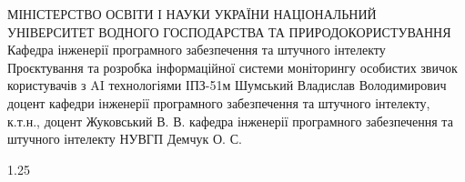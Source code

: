 \documentclass[14pt,a4paper]{extarticle}
\begin{document}
    \makepracticetitlepage
    {МІНІСТЕРСТВО ОСВІТИ І НАУКИ УКРАЇНИ}
    {НАЦІОНАЛЬНИЙ УНІВЕРСИТЕТ ВОДНОГО ГОСПОДАРСТВА ТА ПРИРОДОКОРИСТУВАННЯ}
    {Кафедра інженерії програмного забезпечення та штучного інтелекту}
    {Проєктування та розробка інформаційної системи моніторингу особистих звичок користувачів з AI технологіями}
    {ІПЗ-51м}
    {Шумський Владислав Володимирович}
    {доцент кафедри інженерії програмного забезпечення та штучного інтелекту, \\ к.т.н., доцент Жуковський В. В.}
    {кафедра інженерії програмного забезпечення та штучного інтелекту НУВГП}
    {Демчук О. С.}

    \setcounter{page}{2}
    \pagestyle{fancy}

    

    \clearpage
    \begin{spacing}{1.25}
    \tableofcontents
    \end{spacing}

    
    
    
    
    
\end{document}

